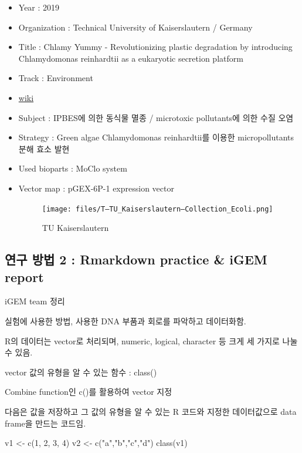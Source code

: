 \documentclass[
]{article}
\newenvironment{Shaded}{\begin{snugshade}}{\end{snugshade}}
\newcommand{\DecValTok}[1]{\textcolor[rgb]{0.00,0.00,0.81}{#1}}
\newcommand{\FunctionTok}[1]{\textcolor[rgb]{0.00,0.00,0.00}{#1}}
\newcommand{\NormalTok}[1]{#1}
\newcommand{\OtherTok}[1]{\textcolor[rgb]{0.56,0.35,0.01}{#1}}
\newcommand{\StringTok}[1]{\textcolor[rgb]{0.31,0.60,0.02}{#1}}
\begin{document}
\begin{itemize}
\item
  Year : 2019
\item
  Organization : Technical University of Kaiserslautern / Germany
\item
  Title : Chlamy Yummy - Revolutionizing plastic degradation by
  introducing Chlamydomonas reinhardtii as a eukaryotic secretion
  platform
\item
  Track : Environment
\item
  \href{https://2020.igem.org/Team:TU_Kaiserslautern}{wiki}
\item
  Subject : IPBES에 의한 동식물 멸종 / microtoxic pollutants에 의한 수질
  오염
\item
  Strategy : Green algae Chlamydomonas reinhardtii를 이용한
  micropollutants 분해 효소 발현
\item
  Used bioparts : MoClo system
\item
  Vector map : pGEX-6P-1 expression vector

  \begin{figure}
  \centering
  \texttt{[image: files/T--TU\_Kaiserslautern--Collection\_Ecoli.png]}
  \caption{TU Kaiserslautern}
  \end{figure}
\end{itemize}

\hypertarget{uxc5f0uxad6c-uxbc29uxbc95-2-rmarkdown-practice-igem-report}{%
\subsection{연구 방법 2 : Rmarkdown practice \& iGEM
report}\label{uxc5f0uxad6c-uxbc29uxbc95-2-rmarkdown-practice-igem-report}}

iGEM team 정리

실험에 사용한 방법, 사용한 DNA 부품과 회로를 파악하고 데이터화함.

R의 데이터는 vector로 처리되며, numeric, logical, character 등 크게 세
가지로 나눌 수 있음.

vector 값의 유형을 알 수 있는 함수 : class()

Combine function인 c()를 활용하여 vector 지정

다음은 값을 저장하고 그 값의 유형을 알 수 있는 R 코드와 지정한
데이터값으로 data frame을 만드는 코드임.

\begin{Shaded}
\begin{Highlighting}[]
\NormalTok{v1 }\OtherTok{\textless{}{-}} \FunctionTok{c}\NormalTok{(}\DecValTok{1}\NormalTok{, }\DecValTok{2}\NormalTok{, }\DecValTok{3}\NormalTok{, }\DecValTok{4}\NormalTok{)}
\NormalTok{v2 }\OtherTok{\textless{}{-}} \FunctionTok{c}\NormalTok{(}\StringTok{"a"}\NormalTok{,}\StringTok{"b"}\NormalTok{,}\StringTok{"c"}\NormalTok{,}\StringTok{"d"}\NormalTok{)}
\FunctionTok{class}\NormalTok{(v1)}
\end{Highlighting}
\end{Shaded}
\end{document}
